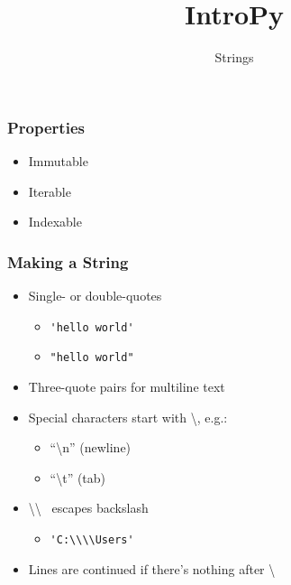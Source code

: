 \documentclass{beamer}
\title{IntroPy}
\subtitle{Strings}
\begin{document}
\frame{\titlepage}


%
%
\begin{frame}
  \frametitle{Properties}
  \begin{itemize}
    \item Immutable
    \item Iterable
    \item Indexable
  \end{itemize}
\end{frame}


%
%
\begin{frame}
  \frametitle{Making a String}
  \begin{itemize}
    \item Single- or double-quotes
      \begin{itemize}
        \item \lstinline{'hello world'} 
	\item \lstinline{"hello world"}
      \end{itemize}

    \item Three-quote pairs for multiline text

    \item Special characters start with \textbackslash, e.g.: 
      \begin{itemize}
        \item ``\textbackslash n'' (newline)
	\item ``\textbackslash t'' (tab) 
      \end{itemize}

    \item \textbackslash \textbackslash~ escapes backslash 
      \begin{itemize}
        \item \lstinline{'C:\\\\Users'}
      \end{itemize}

    \item Lines are continued if there's nothing after \textbackslash 

 \end{itemize}
\end{frame}
\end{document}
